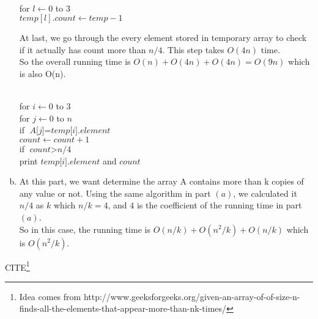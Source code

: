 \documentclass[11pt]{article}
\begin{document}
\begin{solution}
\begin{enumerate}[(a)]
\begin{center}
\begin{algorithm}
		\\ for $\textit{l} \gets 0$ to $3$\+
		\\ $\textit{temp}[l].count \gets \textit{temp} - 1$\-\-
	\end{algorithm}
\end{center}
At last, we go through the every element stored in temporary array to check if it actually has count more than $n/4$. This step takes $O(4n)$ time.\\
So the overall running time is $O(n) + O(4n) + O(4n) = O(9n)$ which is also O(n). 
\begin{center}
	\begin{algorithm}			
		\+
		\\ for $\textit{i} \gets 0$ to $3$\+
		\\ for $\textit{j} \gets 0$ to $n$\+
		\\ if $\textit{A[j]} = \textit{temp[i].element}$\+
		\\ $\textit{count} \gets \textit{count} + 1$\- \- \-
		\\ if $\textit{count} > \textit{n/4}$\+
		\\ print $\textit{temp[i].element}$ and $count$ 
	\end{algorithm}
\end{center}
\item
At this part, we want determine the array A contains more than k copies of any value or not. Using the same algorithm in part $(a)$, we calculated it $n/4$ as $k$ which $n/k = 4$, and $4$ is the coefficient of the running time in part $(a)$.\\
So in this case, the running time is $O(n/k) + O(n^2/k) + O(n/k)$ which is $O(n^2/k)$.

\end{enumerate}
CITE\footnote{Idea comes from http://www.geeksforgeeks.org/given-an-array-of-of-size-n-finds-all-the-elements-that-appear-more-than-nk-times/}


\end{solution}
\end{document}

